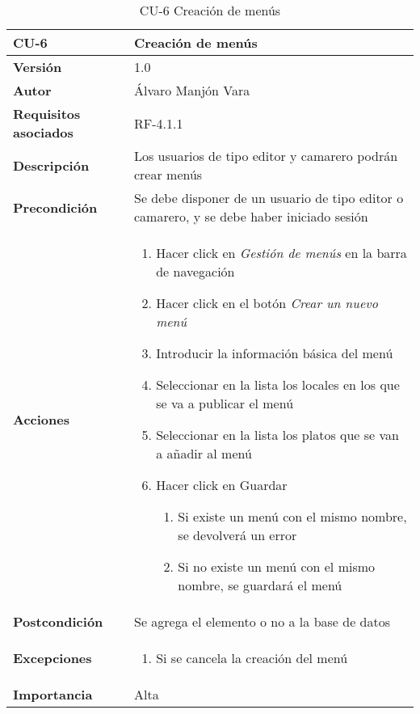 \begin{table}[htp]
	\centering
	\begin{tabularx}{\linewidth}{ p{} p{} }
		\toprule
		\textbf{CU-6}    & \textbf{Creación de menús}\\
		\toprule
		\textbf{Versión}              & 1.0    \\
		\textbf{Autor}                & Álvaro Manjón Vara \\
		\textbf{Requisitos asociados} & RF-4.1.1 \\
		\textbf{Descripción}          & Los usuarios de tipo editor y camarero podrán crear menús \\
		\textbf{Precondición}         & Se debe disponer de un usuario de tipo editor o camarero, y se debe haber iniciado sesión \\
		\textbf{Acciones}             &
		\begin{enumerate}
			\def\labelenumi{\arabic{enumi}.}
			\tightlist
			\item Hacer click en \textit{Gestión de menús} en la barra de navegación
			\item Hacer click en el botón \textit{Crear un nuevo menú}
			\item Introducir la información básica del menú
			\item Seleccionar en la lista los locales en los que se va a publicar el menú
			\item Seleccionar en la lista los platos que se van a añadir al menú
			\item Hacer click en Guardar
			\begin{enumerate}
				\item Si existe un menú con el mismo nombre, se devolverá un error
				\item Si no existe un menú con el mismo nombre, se guardará el menú
			\end{enumerate}
		\end{enumerate}\\
		\textbf{Postcondición}        & Se agrega el elemento o no a la base de datos \\
		\textbf{Excepciones}          & \begin{enumerate}
  \item Si se cancela la creación del menú
\end{enumerate}
 \\
		\textbf{Importancia}          & Alta \\
		\bottomrule
	\end{tabularx}
	\caption{CU-6 Creación de menús}
\end{table}
\afterpage{\clearpage}

